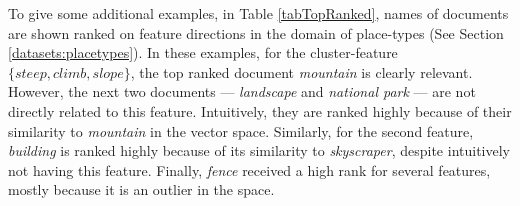 To give some  additional examples, in Table \ref{tabTopRanked}, names of documents are shown ranked on feature directions in the domain of place-types (See Section \ref{datasets:placetypes}). In these examples, for the cluster-feature $\{\textit{steep},\textit{climb},\textit{slope}\}$, the top ranked document \textit{mountain} is clearly relevant. However, the next two documents --- \textit{landscape} and \textit{national park} --- are not directly related to this feature. Intuitively, they are ranked highly because of their similarity to \textit{mountain} in the vector space. Similarly, for the second feature, \textit{building} is ranked highly because of its similarity to \textit{skyscraper}, despite intuitively not having this feature. Finally, \textit{fence} received a high rank for several features,  mostly because it is an outlier in the space. 



